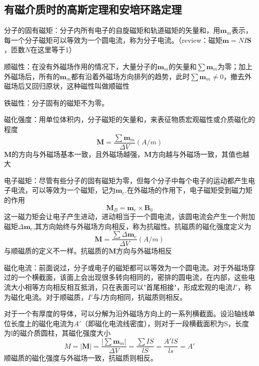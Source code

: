 \subsection{有磁介质时的高斯定理和安培环路定理}
分子的固有磁矩：分子内所有电子的自旋磁矩和轨道磁矩的矢量和，用$\bm{m}_m$表示，每一个分子磁矩可以等效为一个圆电流，称为分子电流。（review：磁矩$\bm{m}=NI\bm{S}$，匝数$N$在这里等于1）

顺磁性：在没有外磁场作用的情况下，大量分子的$\bm{m}_m$的矢量和$\sum \bm{m}_m$为零；加上外磁场后，所有的$\bm{m}_m$都有沿着外磁场方向排列的趋势，此时$\sum \bm{m}_m\ne 0$，撤去外磁场后又回归原状，这种磁性叫做顺磁性

铁磁性：分子固有的磁矩不为零。

磁化强度：用单位体积内，分子磁矩的矢量和，来表征物质宏观磁性或介质磁化的程度
\begin{equation}
    \bm{M}=\dfrac{\sum \bm{m}_m}{\Delta V}(A/m)
\end{equation}
$\bm{M}$的方向与外磁场基本一致，且外磁场越强，$\bm{M}$方向越与外磁场一致，其值也越大

电子磁矩：尽管有些分子的固有磁矩为零，但每个分子中每个电子的运动都产生电子电流，可以等效为一个磁矩，记为$\bm{m}_e$.在外磁场的作用下，电子磁矩受到磁力矩的作用
\begin{equation}
    \bm{M}_B=\bm{m}_e\times \bm{B}_0
\end{equation}
这一磁力矩会让电子产生进动，进动相当于一个圆电流，该圆电流会产生一个附加磁矩$\Delta \bm{m}_e$,其方向始终与外磁场方向相反，称为抗磁性。抗磁质的磁化强度定义为
\begin{equation}
    \bm{M}=\dfrac{\sum \Delta \bm{m}_e}{\Delta V}(A/m)
\end{equation}
与顺磁质的定义不一样。抗磁质的$\bm{M}$方向与外磁场相反

磁化电流：前面说过，分子或电子的磁矩都可以等效为一个圆电流。对于外磁场穿过的一个横截面，该面上会出现很多转向相同的，密排的圆电流，在内部，这些电流大小相等方向相反相互抵消，只在表面可以"首尾相接"，形成宏观的电流$I'$，称为磁化电流。对于顺磁质，$I'$与$I$方向相同，抗磁质则相反。 

对于一个有厚度的导体，可以分解为沿外磁场方向上的一系列横截面。设沿轴线单位长度上的磁化电流为$A'$（即磁化电流线密度），则对于一段横截面积为S，长度为l的磁介质圆柱，其磁化强度大小
\begin{equation}
    \label{A'}
    M=|\bm{M}|=\dfrac{|\sum \bm{m}_m|}{\Delta V}=\dfrac{\sum IS}{lS}=\dfrac{A' l S}{ls}=A'
\end{equation}
顺磁质的磁化强度与外磁场一致，抗磁质则相反。

